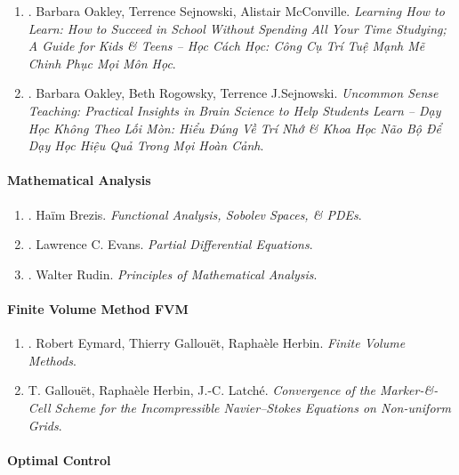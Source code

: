 \documentclass{article}
\begin{document}
\begin{enumerate}
	\item \cite{Oakley_Sejnowski_McConville_learn_how_learn}. Barbara Oakley, Terrence Sejnowski, Alistair McConville. {\it Learning How to Learn: How to Succeed in School Without Spending All Your Time Studying; A Guide for Kids \& Teens -- Học Cách Học: Công Cụ Trí Tuệ Mạnh Mẽ Chinh Phục Mọi Môn Học}.\hfill{\sf[done]}
	\item \cite{Oakley_Rogowsky_Sejnowski_McConville_uncommon_sense_teaching}. Barbara Oakley, Beth Rogowsky, Terrence J.Sejnowski. {\it Uncommon Sense Teaching: Practical Insights in Brain Science to Help Students Learn -- Dạy Học Không Theo Lối Mòn: Hiểu Đúng Về Trí Nhớ \& Khoa Học Não Bộ Để Dạy Học Hiệu Quả Trong Mọi Hoàn Cảnh}.\hfill{\sf[reading]}
\end{enumerate}

\paragraph{Mathematical Analysis}

\begin{enumerate}
	\item \cite{Brezis2011}. Ha\"im Brezis. {\it Functional Analysis, Sobolev Spaces, \& PDEs}.\hfill{\sf[reading]}
	\item \cite{Evans2010}. Lawrence C. Evans. {\it Partial Differential Equations}.\hfill{\sf[reading]}
	\item \cite{Rudin1976}. Walter Rudin. {\it Principles of Mathematical Analysis}.\hfill{\sf[done]}
\end{enumerate}

\paragraph{Finite Volume Method FVM}

\begin{enumerate}
	\item \cite{Eymard_Gallouet_Herbin2019}. Robert Eymard, Thierry Gallou\"et, Rapha\`ele Herbin. {\it Finite Volume Methods}.\hfill{\sf[reading]}
	\item T. Gallou\"et, Rapha\`ele Herbin, J.-C. Latch\'e. {\it Convergence of the Marker-\&-Cell Scheme for the Incompressible Navier--Stokes Equations on Non-uniform Grids}.\hfill{\sf[reading]}
\end{enumerate}

\paragraph{Optimal Control}
\end{document}
